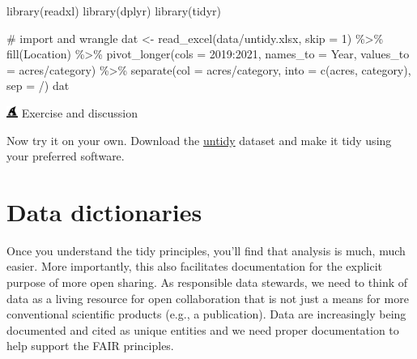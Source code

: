\documentclass[
  letterpaper,
  DIV=11,
  numbers=noendperiod]{scrreprt}
\newenvironment{Shaded}{\begin{snugshade}}{\end{snugshade}}
\newcommand{\AttributeTok}[1]{\textcolor[rgb]{0.40,0.45,0.13}{#1}}
\newcommand{\CommentTok}[1]{\textcolor[rgb]{0.37,0.37,0.37}{#1}}
\newcommand{\DecValTok}[1]{\textcolor[rgb]{0.68,0.00,0.00}{#1}}
\newcommand{\FunctionTok}[1]{\textcolor[rgb]{0.28,0.35,0.67}{#1}}
\newcommand{\NormalTok}[1]{\textcolor[rgb]{0.00,0.23,0.31}{#1}}
\newcommand{\OtherTok}[1]{\textcolor[rgb]{0.00,0.23,0.31}{#1}}
\newcommand{\SpecialCharTok}[1]{\textcolor[rgb]{0.37,0.37,0.37}{#1}}
\newcommand{\StringTok}[1]{\textcolor[rgb]{0.13,0.47,0.30}{#1}}
\begin{document}
\begin{Shaded}
\begin{Highlighting}[]
\FunctionTok{library}\NormalTok{(readxl)}
\FunctionTok{library}\NormalTok{(dplyr)}
\FunctionTok{library}\NormalTok{(tidyr)}

\CommentTok{\# import and wrangle}
\NormalTok{dat }\OtherTok{\textless{}{-}} \FunctionTok{read\_excel}\NormalTok{(}\StringTok{\textquotesingle{}data/untidy.xlsx\textquotesingle{}}\NormalTok{, }\AttributeTok{skip =} \DecValTok{1}\NormalTok{) }\SpecialCharTok{\%\textgreater{}\%} 
  \FunctionTok{fill}\NormalTok{(Location) }\SpecialCharTok{\%\textgreater{}\%} 
  \FunctionTok{pivot\_longer}\NormalTok{(}\AttributeTok{cols =} \StringTok{\textasciigrave{}}\AttributeTok{2019}\StringTok{\textasciigrave{}}\SpecialCharTok{:}\StringTok{\textasciigrave{}}\AttributeTok{2021}\StringTok{\textasciigrave{}}\NormalTok{, }\AttributeTok{names\_to =} \StringTok{\textquotesingle{}Year\textquotesingle{}}\NormalTok{, }\AttributeTok{values\_to =} \StringTok{\textquotesingle{}acres/category\textquotesingle{}}\NormalTok{) }\SpecialCharTok{\%\textgreater{}\%} 
  \FunctionTok{separate}\NormalTok{(}\AttributeTok{col =} \StringTok{\textasciigrave{}}\AttributeTok{acres/category}\StringTok{\textasciigrave{}}\NormalTok{, }\AttributeTok{into =} \FunctionTok{c}\NormalTok{(}\StringTok{\textquotesingle{}acres\textquotesingle{}}\NormalTok{, }\StringTok{\textquotesingle{}category\textquotesingle{}}\NormalTok{), }\AttributeTok{sep =} \StringTok{\textquotesingle{}/\textquotesingle{}}\NormalTok{)}
\NormalTok{dat}
\end{Highlighting}
\end{Shaded}

\includegraphics[width=1em,height=1em]{./impact_files/figure-pdf/fa-icon-20d474448f872ee43905e611a2502347.pdf}
Exercise and discussion

Now try it on your own. Download the
\href{https://github.com/tbep-tech/cerf-os-workshop/raw/master/data/untidy.xlsx}{untidy}
dataset and make it tidy using your preferred software.

\hypertarget{data-dictionaries}{%
\section{Data dictionaries}\label{data-dictionaries}}

Once you understand the tidy principles, you'll find that analysis is
much, much easier. More importantly, this also facilitates documentation
for the explicit purpose of more open sharing. As responsible data
stewards, we need to think of data as a living resource for open
collaboration that is not just a means for more conventional scientific
products (e.g., a publication). Data are increasingly being documented
and cited as unique entities and we need proper documentation to help
support the FAIR principles.
\end{document}
